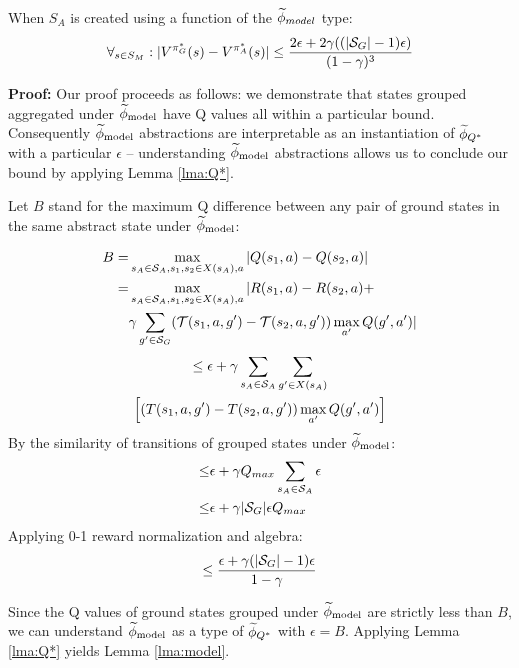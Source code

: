 
\begin{lma}
\label{lma:model}
When $S_A$ is created using a function of the $\widetilde \phi_{model}$ type:
\begin{equation}
\forall_{s \in S_M} : | V^{\pi^*_G}(s) - V^{\pi^*_{A}}(s) | \leq \frac{2\epsilon + 2\gamma((|\mathcal{S}_G|-1)\epsilon)}{(1-\gamma)^3}
\end{equation}
\end{lma}

{\bf Proof:} Our proof proceeds as follows: we demonstrate that states grouped aggregated under $\widetilde \phi_{\text{model}}$ have Q values all within a particular bound. Consequently $\widetilde \phi_{\text{model}}$ abstractions are interpretable as an instantiation of $\widetilde \phi_{Q^*}$ with a particular $\epsilon$ -- understanding $\widetilde \phi_{\text{model}}$ abstractions allows us to conclude our bound by applying Lemma \ref{lma:Q*}.


Let $B$ stand for the maximum Q difference between any pair of ground states in the same abstract state under $\widetilde \phi_{\text{model}}$:

\begin{align*}
B = &\max_{s_A \in \mathcal{S}_A, s_1, s_2 \in X(s_A), a} |Q(s_1, a) - Q(s_2, a)|\\
=&\max_{s_A \in \mathcal{S}_A, s_1, s_2 \in X(s_A), a}      |R(s_1, a) - R(s_2, a) +\\
& \gamma \sum_{g' \in \mathcal{S}_G}(\mathcal{T}(s_1,a,g')-\mathcal{T}(s_2, a, g'))\max_{a'}Q(g', a')|
\end{align*}
\begin{multline*}
\leq \epsilon + \gamma \sum_{s_A \in \mathcal{S}_A}\sum_{g' \in X(s_A)} \\ \left[(T(s_1, a, g')-T(s_2, a, g')) 		\max_{a'}Q(g', a')	\right]
\end{multline*}
By the similarity of transitions of grouped states under $\widetilde \phi_{\text{model}}$:
\begin{align*}
 \leq &\epsilon + \gamma Q_{max} \sum_{s_A \in \mathcal{S}_A} \epsilon \\
\leq& \epsilon + \gamma|\mathcal{S}_G|\epsilon Q_{max}
\end{align*}
Applying 0-1 reward normalization and algebra:
\begin{equation*}
 \leq \frac{\epsilon + \gamma(|\mathcal{S}_G| - 1) \epsilon}{1-\gamma}
\end{equation*}

Since the Q values of ground states grouped under $\widetilde \phi_{\text{model}}$ are strictly less than $B$, we can understand $\widetilde \phi_{\text{model}}$ as a type of $\widetilde \phi_{Q^*}$ with $\epsilon = B$. Applying Lemma \ref{lma:Q*} yields Lemma \ref{lma:model}.

